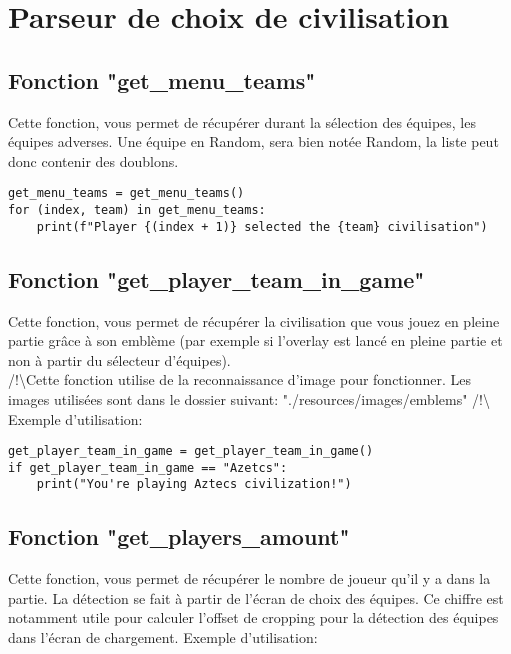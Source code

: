 
\section{Parseur de choix de civilisation}
\subsection{Fonction "get\_menu\_teams"}
Cette fonction, vous permet de récupérer durant la sélection des équipes, les équipes adverses. Une équipe en Random, sera bien notée Random, la liste peut donc contenir des doublons.

\begin{verbatim}
get_menu_teams = get_menu_teams()
for (index, team) in get_menu_teams:
    print(f"Player {(index + 1)} selected the {team} civilisation")
\end{verbatim}

\subsection{Fonction "get\_player\_team\_in\_game"}
Cette fonction, vous permet de récupérer la civilisation que vous jouez en pleine partie grâce à son emblème (par exemple si l'overlay est lancé en pleine partie et non à partir du sélecteur d'équipes).\\/!\textbackslash Cette fonction utilise de la reconnaissance d'image pour fonctionner. Les images utilisées sont dans le dossier suivant: "./resources/images/emblems" /!\textbackslash\\
Exemple d'utilisation:

\begin{verbatim}
get_player_team_in_game = get_player_team_in_game()
if get_player_team_in_game == "Azetcs":
    print("You're playing Aztecs civilization!")
\end{verbatim}

\subsection{Fonction "get\_players\_amount"}
Cette fonction, vous permet de récupérer le nombre de joueur qu'il y a dans la partie. La détection se fait à partir de l'écran de choix des équipes. Ce chiffre est notamment utile pour calculer l'offset de cropping pour la détection des équipes dans l'écran de chargement.
Exemple d'utilisation:

